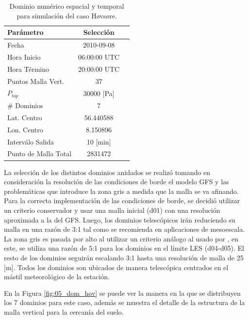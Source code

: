 \begin{table}[h!]
	\caption{Dominio numérico espacial y temporal para simulación del caso Høvsøre.}\label{tab:05_config_hov}
	\centering\footnotesize
	\begin{tabular}{lcc}
		\toprule
		Parámetro & Selección \\
		\midrule
		Fecha	 	 & 2010-09-08   \\
		Hora Inicio	 	 & 06:00:00   UTC \\
		Hora Término	 		 & 20:00:00 UTC  \\
		Puntos Malla Vert.	 	 & 37   \\
		$P_{top}$ 	& 30000 [Pa]\\
		\# Dominios	& 7   \\
		Lat. Centro	& 56.440588   \\
		Lon. Centro	& 8.150896   \\
		Interválo Salida & 10 [min]\\
		Punto de Malla Total & 2831472\\
		\bottomrule
	\end{tabular}
\end{table}

La selección de los distintos dominios anidados se realizó tomando en consideración la resolución de las condiciones de borde el modelo GFS y las problemáticas que introduce la zona gris a medida que la malla se va afinando. Para la correcta implementación de las condiciones de borde, se decidió utilizar un criterio conservador y usar una malla inicial (d01) con una resolución aproximada a la del GFS. Luego, los dominios telescópicos irán reduciendo su malla en una razón de 3:1 tal como se recomienda en aplicaciones de mesoescala. La zona gris es pasada por alto al utilizar un criterio análogo al usado por \cite{Green2015}, en este, se utiliza una razón de 5:1 para los dominios en el límite LES (d04-d05). El resto de los dominios seguirán escalando 3:1 hasta una resolución de malla de 25 [m]. Todos los dominios son ubicados de manera telescópica centrados en el mástil meteorológico de la estación.

En la Figura \ref{fig:05_dom_hov} se puede ver la manera en la que se distribuyen los 7 dominios para este caso, además se muestra el detalle de la estructura de la malla vertical para la cercanía del suelo.

